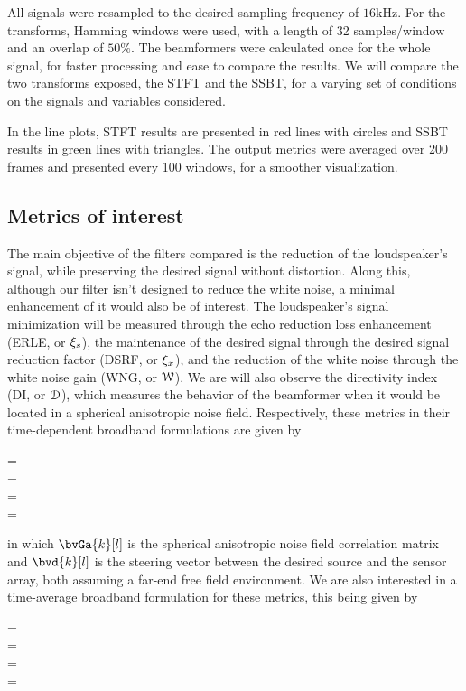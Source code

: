 All signals were resampled to the desired sampling frequency of $16\si{\kilo\hertz}$. For the transforms, Hamming windows were used, with a length of 32 samples/window and an overlap of $50\%$. The beamformers were calculated once for the whole signal, for faster processing and ease to compare the results. We will compare the two transforms exposed, the STFT and the SSBT, for a varying set of conditions on the signals and variables considered.

In the line plots, STFT results are presented in red lines with circles and SSBT results in green lines with triangles. The output metrics were averaged over 200 frames and presented every 100 windows, for a smoother visualization.
%

\subsection{Metrics of interest}

The main objective of the filters compared is the reduction of the loudspeaker's signal, while preserving the desired signal without distortion. Along this, although our filter isn't designed to reduce the white noise, a minimal enhancement of it would also be of interest. The loudspeaker's signal minimization will be measured through the echo reduction loss enhancement (ERLE, or $\xi_{s}$), the maintenance of the desired signal through the desired signal reduction factor (DSRF, or $\xi_{x}$), and the reduction of the white noise through the white noise gain (WNG, or $\mathcal{W}$). We are will also observe the directivity index (DI, or $\mathcal{D}$), which measures the behavior of the beamformer when it would be located in a spherical anisotropic noise field. Respectively, these metrics in their time-dependent broadband formulations are given by
\begin{subgather}
	\dsrf[l] =  \\
	\erle[l] =  \\
	\wng[l] =  \\
	\di[l] = 
\end{subgather}
in which $\bvGa{k}[l]$ is the spherical anisotropic noise field correlation matrix \cite{habets_generating_2007} and $\bvd{k}[l]$ is the steering vector between the desired source and the sensor array, both assuming a far-end free field environment. We are also interested in a time-average broadband formulation for these metrics, this being given by
\begin{subgather}
	\dsrf =  \\
	\erle =  \\
	\wng =  \\
	\di = 
\end{subgather}

